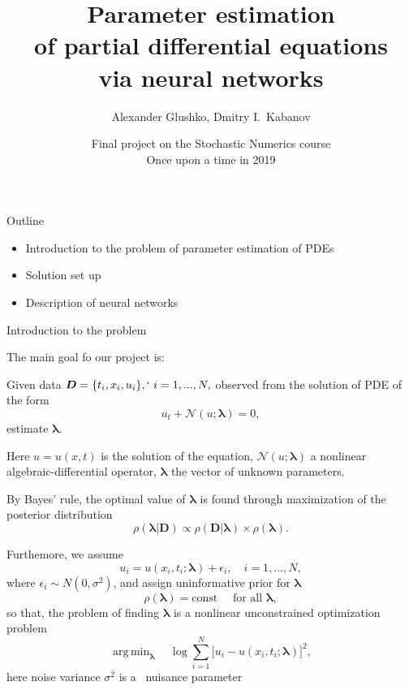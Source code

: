 \documentclass{beamer}
\title{\vspace{-0.5cm}Parameter estimation\\of partial differential equations\\via neural networks}
\author{Alexander Glushko, Dmitry I.\ Kabanov}
\date{Final project on the Stochastic Numerics course\\Once upon a time in 2019}
\newcommand{\Data}{\vec{D}}
\renewcommand{\vec}[1]{\boldsymbol{#1}}
\newcommand{\VLambda}{\ensuremath{\vec{\lambda}}}
\DeclareMathOperator*{\argmin}{arg\,min}
\newcommand{\NonlinOp}{\mathcal N\!}
\begin{document}
\maketitle

\begin{frame}{Outline}
\begin{itemize}
    \item Introduction to the problem of parameter estimation of PDEs
    \item Solution set up
    \item Description of neural networks
\end{itemize}
\end{frame}

\begin{frame}{Introduction to the problem}

The main goal fo our project is:

Given data $\vec{D} = \{t_i, x_i, u_i\},`~i = 1, ..., N,$ observed from the solution of PDE of the form
\begin{equation}
    \label{eq:pde}
    u_t + \mathcal N\!(u; \VLambda) = 0,
\end{equation}
estimate $\VLambda$.

Here $u=u(x, t)$ is the solution of the equation,
$\NonlinOp(u; \VLambda)$ a nonlinear algebraic-differential operator,
$\VLambda$ the vector of unknown parameters.

\end{frame}

\begin{frame}

By Bayes' rule, the optimal value of $\VLambda$ is found through
maximization of the posterior distribution \cite{sivia2006data}
\begin{equation}
    \rho( \VLambda | \Data ) \propto
    \rho( \Data | \VLambda ) \times \rho( \VLambda ).
\end{equation}

Furthemore, we assume
\begin{equation}
    u_i = u(x_i, t_i; \VLambda) + \epsilon_i, \quad i=1, \dots, N,
\end{equation}
where $\epsilon_i \sim N(0, \sigma^2)$, and assign uninformative prior for $\VLambda$
\begin{equation}
    \rho(\vec{\lambda}) = \text{const} \quad \text{ for all } \vec{\lambda},
\end{equation}
so that, the problem of finding $\VLambda$ is a nonlinear unconstrained
optimization problem
\begin{equation}
    \label{eq:optim-ideal}
    \argmin_{\VLambda} \quad 
    \log \sum_{i=1}^{N} \big[ u_i - u(x_i, t_i; \VLambda) \big]^2,
\end{equation}
here noise variance $\sigma^2$ is a~
nuisance parameter~\cite[section~8.2]{sivia2006data}
    
\end{frame}
\end{document}
